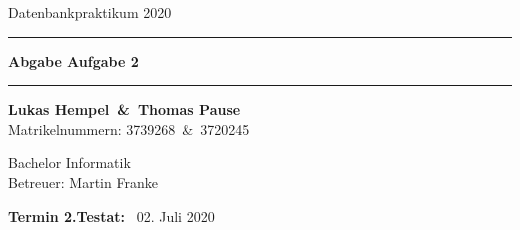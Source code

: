 \begin{titlepage}
    \begin{center}

        \vspace{\fill}
        \huge{Datenbankpraktikum 2020}\\

        \vspace{20pt}

        \hrule
        \vspace{26pt}
        \Huge \textbf{Abgabe Aufgabe 2}
        \vspace{20pt}
        \hrule

        \vspace{10pt}

        \vspace{\fill}
        \Large{\textbf{Lukas Hempel~\&~Thomas Pause}} %
        ~\\
        \Large{Matrikelnummern: 3739268~\&~3720245}

        \Large{Bachelor Informatik}
        ~\\
        \Large{Betreuer: Martin Franke}
        \vspace{\fill}

    \end{center}

    \begin{flushright}

        \Large{\textbf{Termin 2.Testat:}} ~\Large{02. Juli 2020}
    \end{flushright}

\end{titlepage}
